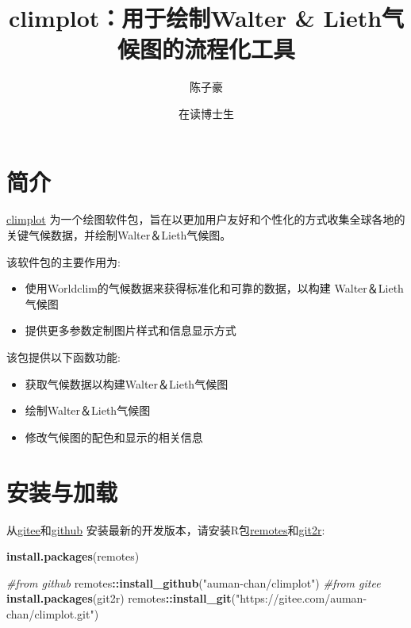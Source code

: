 \documentclass[
]{ctexart}
\title{climplot：用于绘制Walter \& Lieth气候图的流程化工具}
\author{陈子豪 \and 在读博士生}
\date{}
\newenvironment{Shaded}{\begin{snugshade}}{\end{snugshade}}
\newcommand{\CommentTok}[1]{\textcolor[rgb]{0.56,0.35,0.01}{\textit{#1}}}
\newcommand{\FunctionTok}[1]{\textcolor[rgb]{0.13,0.29,0.53}{\textbf{#1}}}
\newcommand{\NormalTok}[1]{#1}
\newcommand{\SpecialCharTok}[1]{\textcolor[rgb]{0.81,0.36,0.00}{\textbf{#1}}}
\newcommand{\StringTok}[1]{\textcolor[rgb]{0.31,0.60,0.02}{#1}}
\begin{document}
\maketitle

{
\setcounter{tocdepth}{2}
\tableofcontents
}
\hypertarget{ux7b80ux4ecb}{%
\section{简介}\label{ux7b80ux4ecb}}

\href{https://gitee.com/auman-chan/climplot}{climplot}
为一个绘图软件包，旨在以更加用户友好和个性化的方式收集全球各地的关键气候数据，并绘制Walter＆Lieth气候图。

该软件包的主要作用为:

\begin{itemize}
\item
  使用Worldclim的气候数据来获得标准化和可靠的数据，以构建 Walter＆Lieth
  气候图
\item
  提供更多参数定制图片样式和信息显示方式
\end{itemize}

该包提供以下函数功能:

\begin{itemize}
\item
  获取气候数据以构建Walter＆Lieth气候图
\item
  绘制Walter＆Lieth气候图
\item
  修改气候图的配色和显示的相关信息
\end{itemize}

\hypertarget{ux5b89ux88c5ux4e0eux52a0ux8f7d}{%
\section{安装与加载}\label{ux5b89ux88c5ux4e0eux52a0ux8f7d}}

从\href{https://gitee.com}{gitee}和\href{https://github.com/}{github}
安装最新的开发版本，请安装R包\href{https://cran.r-project.org/package=remotes}{remotes}和\href{https://cran.r-project.org/package=git2r}{git2r}:

\begin{Shaded}
\begin{Highlighting}[]
\FunctionTok{install.packages}\NormalTok{(}\StringTok{\textquotesingle{}remotes\textquotesingle{}}\NormalTok{)}

\CommentTok{\#from github}
\NormalTok{remotes}\SpecialCharTok{::}\FunctionTok{install\_github}\NormalTok{(}\StringTok{"auman{-}chan/climplot"}\NormalTok{)}
\CommentTok{\#from gitee}
\FunctionTok{install.packages}\NormalTok{(}\StringTok{\textquotesingle{}git2r\textquotesingle{}}\NormalTok{)}
\NormalTok{remotes}\SpecialCharTok{::}\FunctionTok{install\_git}\NormalTok{(}\StringTok{"https://gitee.com/auman{-}chan/climplot.git"}\NormalTok{)}
\end{Highlighting}
\end{Shaded}
\end{document}
